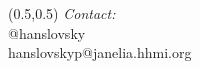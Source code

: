 \documentclass[aspectratio=169,table]{beamer}
\begin{document}
\begin{frame}
    \begin{textblock}{6}(0.5,0.5)
        \small
        \emph{Contact:} \\
        \vspace{0.5ex}
        \hspace{0.5ex}@hanslovsky \\
        \hspace{0.5ex}hanslovskyp@janelia.hhmi.org
    \end{textblock}

\end{frame}
\end{document}
